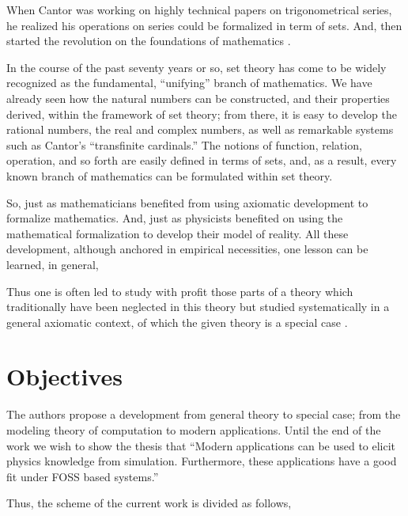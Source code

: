 \documentclass[
12pt,				%
openright,			%
oneside,			%
a4paper,			%
brazil,				%
english,			%
]{abntex2}
\begin{document}
When Cantor was working on highly technical papers on trigonometrical
series, he realized his operations on series could be formalized in
term of sets. And, then started the revolution on the foundations of mathematics \cite{pinter2014book}.

\begin{citacao}
In the course of the past seventy years or so, set theory has come to be
widely recognized as the fundamental, “unifying” branch of mathematics. We
have already seen how the natural numbers can be constructed, and
their properties derived, within the framework of set theory; from
there, it is easy to develop the rational numbers, the real and
complex numbers, as well as remarkable systems such as Cantor’s
“transfinite cardinals.” The notions of function, relation, operation,
and so forth are easily defined in terms of sets, and, as a result,
every known branch of mathematics can be formulated within set
theory. \cite{pinter2014book}
\end{citacao}

So, just as mathematicians benefited from using axiomatic
development to formalize mathematics. And, just as physicists
benefited on using the mathematical formalization to develop their
model of reality. All these development, although anchored in
empirical necessities, one lesson can be learned, in general,

\begin{citacao}
  Thus one is often led to study with profit those parts of a
  theory which traditionally have been neglected in this theory but studied
  systematically in a general axiomatic context, of which the given theory
  is a special case \cite{bourbaki2004theory}.
\end{citacao}

\section{Objectives}


The authors propose a development from general theory to special case;
from the modeling theory of computation to modern applications. Until the
end of the work we wish to show the thesis that ``Modern applications
can be used to elicit physics knowledge from simulation. Furthermore,
these applications have a good fit under FOSS based systems.''

Thus, the scheme of the current work is divided as follows,

\end{document}
